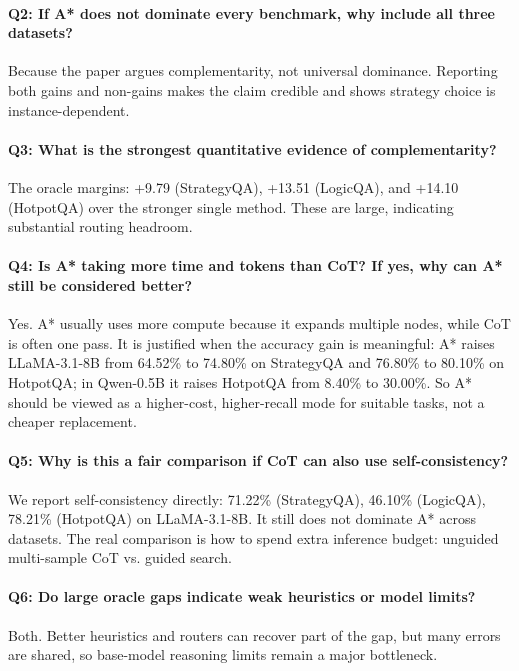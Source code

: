 \documentclass[11pt]{article}
\begin{document}
\paragraph{Q2: If A* does not dominate every benchmark, why include all three datasets?}
Because the paper argues complementarity, not universal dominance. Reporting both gains and non-gains makes the claim credible and shows strategy choice is instance-dependent.

\paragraph{Q3: What is the strongest quantitative evidence of complementarity?}
The oracle margins: +9.79 (StrategyQA), +13.51 (LogicQA), and +14.10 (HotpotQA) over the stronger single method. These are large, indicating substantial routing headroom.

\paragraph{Q4: Is A* taking more time and tokens than CoT? If yes, why can A* still be considered better?}
Yes. A* usually uses more compute because it expands multiple nodes, while CoT is often one pass. It is justified when the accuracy gain is meaningful: A* raises LLaMA-3.1-8B from 64.52\% to 74.80\% on StrategyQA and 76.80\% to 80.10\% on HotpotQA; in Qwen-0.5B it raises HotpotQA from 8.40\% to 30.00\%. So A* should be viewed as a higher-cost, higher-recall mode for suitable tasks, not a cheaper replacement.

\paragraph{Q5: Why is this a fair comparison if CoT can also use self-consistency?}
We report self-consistency directly: 71.22\% (StrategyQA), 46.10\% (LogicQA), 78.21\% (HotpotQA) on LLaMA-3.1-8B. It still does not dominate A* across datasets. The real comparison is how to spend extra inference budget: unguided multi-sample CoT vs. guided search.

\paragraph{Q6: Do large oracle gaps indicate weak heuristics or model limits?}
Both. Better heuristics and routers can recover part of the gap, but many errors are shared, so base-model reasoning limits remain a major bottleneck.
\end{document}
